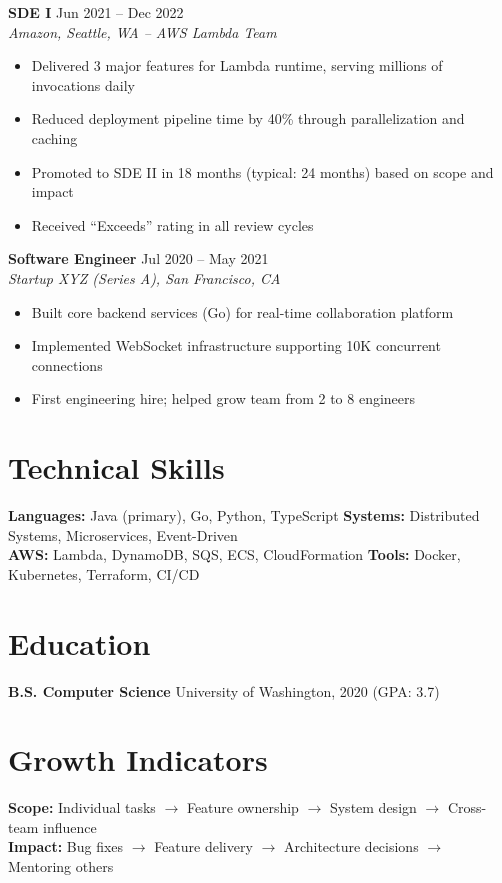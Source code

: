 \documentclass[11pt,a4paper]{article}
\newcommand{\progression}{\textcolor{accent}{$\longrightarrow$}}
\begin{document}
\vspace{0.5em}

\noindent\textbf{SDE I} \hfill \textcolor{accent}{Jun 2021 -- Dec 2022}\\
\textit{Amazon, Seattle, WA -- AWS Lambda Team}
\begin{itemize}[leftmargin=1.2em,nosep,label={\color{accent}\textbullet}]
\item Delivered 3 major features for Lambda runtime, serving millions of invocations daily
\item Reduced deployment pipeline time by 40\% through parallelization and caching
\item Promoted to SDE II in 18 months (typical: 24 months) based on scope and impact
\item Received ``Exceeds'' rating in all review cycles
\end{itemize}
\vspace{0.5em}

\noindent\textbf{Software Engineer} \hfill \textcolor{accent}{Jul 2020 -- May 2021}\\
\textit{Startup XYZ (Series A), San Francisco, CA}
\begin{itemize}[leftmargin=1.2em,nosep,label={\color{accent}\textbullet}]
\item Built core backend services (Go) for real-time collaboration platform
\item Implemented WebSocket infrastructure supporting 10K concurrent connections
\item First engineering hire; helped grow team from 2 to 8 engineers
\end{itemize}

\section{Technical Skills}
\noindent\textbf{Languages:} Java (primary), Go, Python, TypeScript \quad\textbf{Systems:} Distributed Systems, Microservices, Event-Driven\\
\textbf{AWS:} Lambda, DynamoDB, SQS, ECS, CloudFormation \quad\textbf{Tools:} Docker, Kubernetes, Terraform, CI/CD

\section{Education}
\noindent\textbf{B.S. Computer Science} \hfill University of Washington, 2020 \quad(GPA: 3.7)

\section{Growth Indicators}
\noindent\textcolor{accent}{\textbf{Scope:}} Individual tasks \progression{} Feature ownership \progression{} System design \progression{} Cross-team influence\\
\textcolor{accent}{\textbf{Impact:}} Bug fixes \progression{} Feature delivery \progression{} Architecture decisions \progression{} Mentoring others
\end{document}
